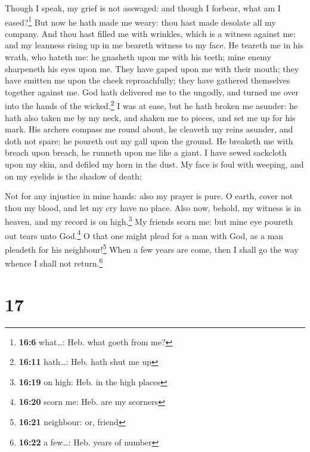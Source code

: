  Though I speak, my grief is not asswaged: and though I
forbear, what am I eased?\footnote{\textbf{16:6} what\ldots: Heb. what
  goeth from me?}  But now he hath made me weary: thou
hast made desolate all my company.  And thou hast filled
me with wrinkles, which is a witness against me: and my leanness rising
up in me beareth witness to my face.  He teareth me in his
wrath, who hateth me: he gnasheth upon me with his teeth; mine enemy
sharpeneth his eyes upon me.  They have gaped upon me
with their mouth; they have smitten me upon the cheek reproachfully;
they have gathered themselves together against me.  God
hath delivered me to the ungodly, and turned me over into the hands of
the wicked.\footnote{\textbf{16:11} hath\ldots: Heb. hath shut me up}
 I was at ease, but he hath broken me asunder: he hath
also taken me by my neck, and shaken me to pieces, and set me up for his
mark.  His archers compass me round about, he cleaveth my
reins asunder, and doth not spare; he poureth out my gall upon the
ground.  He breaketh me with breach upon breach, he
runneth upon me like a giant.  I have sewed sackcloth
upon my skin, and defiled my horn in the dust.  My face
is foul with weeping, and on my eyelids is the shadow of death;

 Not for any injustice in mine hands: also my prayer is
pure.  O earth, cover not thou my blood, and let my cry
have no place.  Also now, behold, my witness is in
heaven, and my record is on high.\footnote{\textbf{16:19} on high: Heb.
  in the high places}  My friends scorn me: but mine eye
poureth out tears unto God.\footnote{\textbf{16:20} scorn me: Heb. are
  my scorners}  O that one might plead for a man with
God, as a man pleadeth for his neighbour!\footnote{\textbf{16:21}
  neighbour: or, friend}  When a few years are come, then
I shall go the way whence I shall not return.\footnote{\textbf{16:22} a
  few\ldots: Heb. years of number}

\hypertarget{section-16}{%
\section{17}\label{section-16}}

